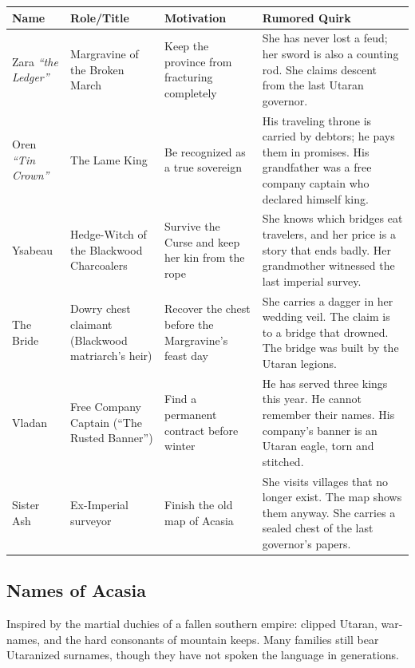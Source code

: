 \begin{longtable}{|p{}|p{}|p{}|p{}|}
\hline
\textbf{Name} & \textbf{Role/Title} & \textbf{Motivation} & \textbf{Rumored Quirk} \\
\hline
Zara \textit{``the Ledger''} & Margravine of the Broken March & Keep the province from fracturing completely & She has never lost a feud; her sword is also a counting rod. She claims descent from the last Utaran governor. \\
\hline
Oren \textit{``Tin Crown''} & The Lame King & Be recognized as a true sovereign & His traveling throne is carried by debtors; he pays them in promises. His grandfather was a free company captain who declared himself king. \\
\hline
Ysabeau & Hedge-Witch of the Blackwood Charcoalers & Survive the Curse and keep her kin from the rope & She knows which bridges eat travelers, and her price is a story that ends badly. Her grandmother witnessed the last imperial survey. \\
\hline
The Bride & Dowry chest claimant (Blackwood matriarch's heir) & Recover the chest before the Margravine's feast day & She carries a dagger in her wedding veil. The claim is to a bridge that drowned. The bridge was built by the Utaran legions. \\
\hline
Vladan & Free Company Captain (``The Rusted Banner'') & Find a permanent contract before winter & He has served three kings this year. He cannot remember their names. His company's banner is an Utaran eagle, torn and stitched. \\
\hline
Sister Ash & Ex-Imperial surveyor & Finish the old map of Acasia & She visits villages that no longer exist. The map shows them anyway. She carries a sealed chest of the last governor's papers. \\
\hline
\end{longtable}

\subsection*{Names of Acasia}
\label{sec:acasia-names}

Inspired by the martial duchies of a fallen southern empire: clipped Utaran, war-names, and the hard consonants of mountain keeps. Many families still bear Utaranized surnames, though they have not spoken the language in generations.

